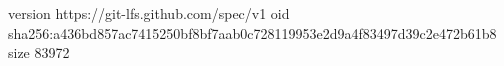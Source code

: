 version https://git-lfs.github.com/spec/v1
oid sha256:a436bd857ac7415250bf8bf7aab0c728119953e2d9a4f83497d39c2e472b61b8
size 83972
